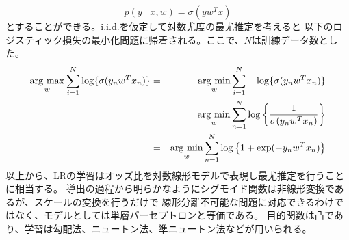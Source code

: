 \begin{equation}
    p(y\mid x,w) = \sigma(yw^Tx)
\end{equation}
とすることができる。{\rm i.i.d.}を仮定して対数尤度の最尤推定を考えると
以下のロジスティック損失の最小化問題に帰着される。ここで、\(N\)は訓練データ数とした。
\begin{eqnarray}
    \mathop{\rm arg~max}\limits_w \sum_{i=1}^N \log \{\sigma(y_nw^Tx_n)\} & = & \mathop{\rm arg~min}\limits_w \sum_{i=1}^N -\log \{\sigma(y_nw^Tx_n)\} \nonumber \\
    &=& \mathop{\rm arg~min}\limits_w \sum_{n=1}^N \log \left\{ \frac{1}{\sigma(y_nw^Tx_n)} \right\} \nonumber \\
    &=& \mathop{\rm arg~min}\limits_w \sum_{n=1}^N \log \left\{ 1+\exp(-y_nw^Tx_n) \right\}
\end{eqnarray}
以上から、LRの学習はオッズ比を対数線形モデルで表現し最尤推定を行うことに相当する。
導出の過程から明らかなようにシグモイド関数は非線形変換であるが、スケールの変換を行うだけで
線形分離不可能な問題に対応できるわけではなく、モデルとしては単層パーセプトロンと等価である。
目的関数は凸であり、学習は勾配法、ニュートン法、準ニュートン法などが用いられる。